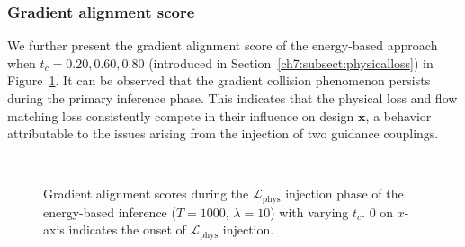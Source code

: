 \subsubsection{Gradient alignment score}
We further present the gradient alignment score of the energy-based approach when $t_c = 0.20, 0.60, 0.80$ (introduced in Section~\ref{ch7:subsect:physicalloss}) in Figure~\ref{ch7:fig:alignmentScore_app}. It can be observed that the gradient collision phenomenon persists during the primary inference phase. This indicates that the physical loss and flow matching loss consistently compete in their influence on design $\textbf{x}$, a behavior attributable to the issues arising from the injection of two guidance couplings.

\label{ch7:sect:gradientAlignmentScore}
\begin{figure}[htbp]
    \centering
    \\
    \quad
    \caption{Gradient alignment scores during the $\mathcal{L}_{\mathrm{phys}}$ injection phase of the energy-based inference ($T = 1000$, $\lambda = 10$) with varying $t_c$. 0 on $x$-axis indicates the onset of $\mathcal{L}_{\mathrm{phys}}$ injection.}
    \label{ch7:fig:alignmentScore_app}
\end{figure}


